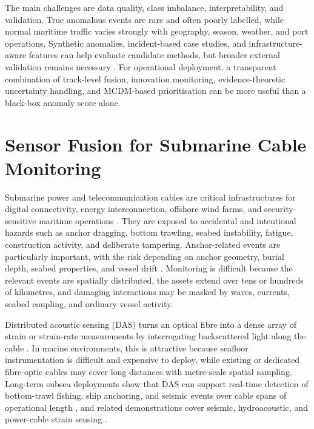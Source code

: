 The main challenges are data quality, class imbalance, interpretability, and validation. True anomalous events are rare and often poorly labelled, while normal maritime traffic varies strongly with geography, season, weather, and port operations. Synthetic anomalies, incident-based case studies, and infrastructure-aware features can help evaluate candidate methods, but broader external validation remains necessary \cite{oliva_tomei_prm_access_2026}. For operational deployment, a transparent combination of track-level fusion, innovation monitoring, evidence-theoretic uncertainty handling, and MCDM-based prioritisation can be more useful than a black-box anomaly score alone.

\section{Sensor Fusion for Submarine Cable Monitoring}

Submarine power and telecommunication cables are critical infrastructures for digital connectivity, energy interconnection, offshore wind farms, and security-sensitive maritime operations \cite{carter_submarine_2009,kavanagh_achieving_2025}. They are exposed to accidental and intentional hazards such as anchor dragging, bottom trawling, seabed instability, fatigue, construction activity, and deliberate tampering. Anchor-related events are particularly important, with the risk depending on anchor geometry, burial depth, seabed properties, and vessel drift \cite{yoon_safety_2013,osthoff_anchor_soil_2017,li_anchor_risk_2025}. Monitoring is difficult because the relevant events are spatially distributed, the assets extend over tens or hundreds of kilometres, and damaging interactions may be masked by waves, currents, seabed coupling, and ordinary vessel activity.

Distributed acoustic sensing (DAS) turns an optical fibre into a dense array of strain or strain-rate measurements by interrogating backscattered light along the cable \cite{hartog_intro_2017,lu_distributed_2019,lindsey_fiberoptic_2021}. In marine environments, this is attractive because seafloor instrumentation is difficult and expensive to deploy, while existing or dedicated fibre-optic cables may cover long distances with metre-scale spatial sampling. Long-term subsea deployments show that DAS can support real-time detection of bottom-trawl fishing, ship anchoring, and seismic events over cable spans of operational length \cite{waagaard_longterm_2022}, and related demonstrations cover seismic, hydroacoustic, and power-cable strain sensing \cite{williams_distributed_2019,matsumoto_hydroacoustic_2021,masoudi_dynamic_2018}.
